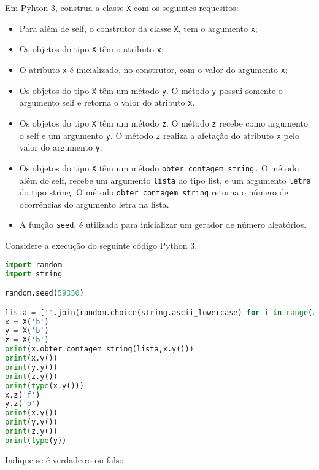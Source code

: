 \documentclass[12pt,varwidth=16cm,border=17pt]{standalone}
\begin{document}
Em Pyhton 3, construa a classe \verb+X+ com os seguintes requesitos:

\begin{itemize}

  \item Para além de self, o construtor da classe \verb+X+, tem o argumento \verb+x+;
  \item Os objetos do tipo \verb+X+ têm o atributo \verb+x+;
  \item O atributo \verb+x+ é inicializado, no construtor, com o valor
	do argumento \verb+x+;
  \item Os objetos do tipo \verb+X+ têm um método \verb+y+. O
    método \verb+y+ possui somente o argumento self e retorna o valor do atributo \verb+x+.
	
  \item Os objetos do tipo \verb+X+ têm um método \verb+z+. O
    método \verb+z+ recebe como argumento o self e um argumento \verb+y+. 
	O método \verb+z+ realiza a afetação do atributo \verb+x+ pelo valor do argumento \verb+y+.
    
 \item Os objetos do tipo \verb+X+ têm um método \verb+obter_contagem_string.+ O
    método além do self, recebe um argumento \verb+lista+ do tipo list, e um argumento \verb+letra+ do tipo string. O método \verb+obter_contagem_string+ retorna o número de ocorrências do argumento letra na lista.
    
 \item A função \verb+seed+, é utilizada para inicializar um gerador de número aleatórios.
    
\end{itemize}

Considere a execução do seguinte código Python 3.






\begin{lstlisting}[language=Python]
import random
import string

random.seed(59350)

lista = [''.join(random.choice(string.ascii_lowercase) for i in range(2)) for i in range(300)]
x = X('b')
y = X('b')
z = X('b')
print(x.obter_contagem_string(lista,x.y()))
print(x.y())
print(y.y())
print(z.y())
print(type(x.y()))
x.z('f')
y.z('p')
print(x.y())
print(y.y())
print(z.y())
print(type(y))
\end{lstlisting}

Indique se é verdadeiro ou falso.
\end{document}
